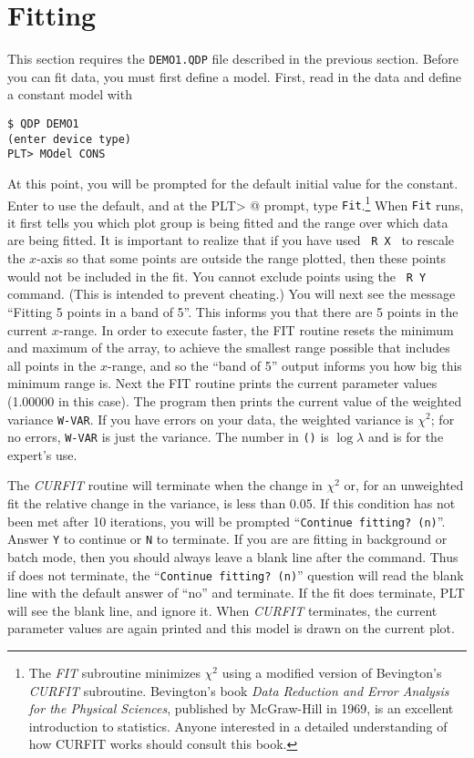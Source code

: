 \section{Fitting}

This section requires the {\tt DEMO1.QDP} file
described in the previous section.
Before you can fit data, you must first define a model.
First, read in the data and define a constant model with
\begin{verbatim}
$ QDP DEMO1
(enter device type)
PLT> MOdel CONS
\end{verbatim}
At this point, you will be prompted for the default initial value
for the constant.
Enter  to use the default,
and at the \verb@ PLT> @ prompt, type {\tt Fit}.\footnote{
The {\it FIT} subroutine minimizes $\chi^2$ using a modified version
of Bevington's {\it CURFIT} subroutine.
Bevington's book
{\it Data Reduction and Error Analysis for the Physical Sciences},
published by McGraw-Hill in 1969,
is an excellent introduction to statistics.
Anyone interested in a detailed understanding of how CURFIT works
should consult this book.}
When {\tt Fit} runs, it first tells you which plot group is being fitted
and the range over which data are being fitted.
It is important to realize that if you have used \, {\tt R X} \,
to rescale the $x$-axis so that some points are outside the range plotted,
then these points would not be included in the fit.
You cannot exclude points using the \, {\tt R~Y} \, command.
(This is intended to prevent cheating.)
You will next see the message ``Fitting 5 points in a band of 5''.
This informs you that there are 5 points in the current $x$-range.
In order to execute faster,
the FIT routine resets the minimum and maximum of the array,
to achieve the smallest range possible that includes all points
in the $x$-range,
and so the ``band of 5'' output informs you
how big this minimum range is.
Next the FIT routine prints the current parameter values
(1.00000 in this case).
The program then prints the current value
of the weighted variance {\tt W-VAR}.
If you have errors on your data,
the weighted variance is $\chi^2$;
for no errors, {\tt W-VAR} is just the variance.
The number in {\tt ()} is $\log \lambda$
and is for the expert's use.

The {\it CURFIT} routine will terminate when the change in $\chi^2$
or, for an unweighted fit the relative change in the variance, is
less than 0.05.
If this condition has not been met after 10 iterations,
you will be prompted ``{\tt Continue fitting?~(n)}''.
Answer {\tt Y} to continue or {\tt N} to terminate.
If you are are fitting in background or batch mode,
then you should always leave a blank line after the \verb@Fit@ command.
Thus if \verb@Fit@ does not terminate, the ``{\tt Continue fitting?~(n)}''
question will read the blank line with the default answer of ``no'' and
terminate.  If the fit does terminate, PLT will see the blank line,
and ignore it.
When {\it CURFIT} terminates,
the current parameter values are again printed
and this model is drawn on the current plot.

